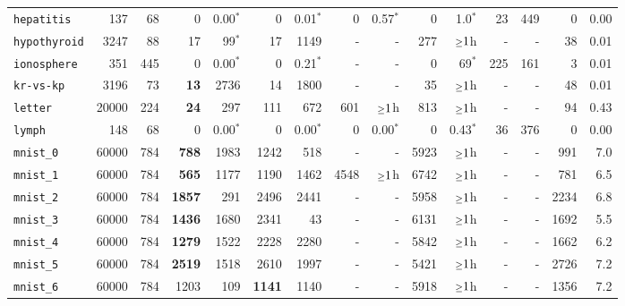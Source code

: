 \begin{tabular}{lccrrrrrrrrrrrr}
\texttt{hepatitis} & \multicolumn{1}{r}{137} & \multicolumn{1}{r}{68}  & 0 & 0.00$^*$ & 0 & 0.01$^*$ & 0 & 0.57$^*$ & 0 & 1.0$^*$ & 23 & 449 & 0 & 0.00\\
\texttt{hypothyroid} & \multicolumn{1}{r}{3247} & \multicolumn{1}{r}{88}  & 17 & 99$^*$ & 17 & 1149 & - & - & 277 & $\mathsmaller{\geq}1$h & - & - & 38 & 0.01\\
\texttt{ionosphere} & \multicolumn{1}{r}{351} & \multicolumn{1}{r}{445}  & 0 & 0.00$^*$ & 0 & 0.21$^*$ & - & - & 0 & 69$^*$ & 225 & 161 & 3 & 0.01\\
\texttt{kr-vs-kp} & \multicolumn{1}{r}{3196} & \multicolumn{1}{r}{73}  & \textbf{13} & 2736 & 14 & 1800 & - & - & 35 & $\mathsmaller{\geq}1$h & - & - & 48 & 0.01\\
\texttt{letter} & \multicolumn{1}{r}{20000} & \multicolumn{1}{r}{224}  & \textbf{24} & 297 & 111 & 672 & 601 & $\mathsmaller{\geq}1$h & 813 & $\mathsmaller{\geq}1$h & - & - & 94 & 0.43\\
\texttt{lymph} & \multicolumn{1}{r}{148} & \multicolumn{1}{r}{68}  & 0 & 0.00$^*$ & 0 & 0.00$^*$ & 0 & 0.00$^*$ & 0 & 0.43$^*$ & 36 & 376 & 0 & 0.00\\
\texttt{mnist\_0} & \multicolumn{1}{r}{60000} & \multicolumn{1}{r}{784}  & \textbf{788} & 1983 & 1242 & 518 & - & - & 5923 & $\mathsmaller{\geq}1$h & - & - & 991 & 7.0\\
\texttt{mnist\_1} & \multicolumn{1}{r}{60000} & \multicolumn{1}{r}{784}  & \textbf{565} & 1177 & 1190 & 1462 & 4548 & $\mathsmaller{\geq}1$h & 6742 & $\mathsmaller{\geq}1$h & - & - & 781 & 6.5\\
\texttt{mnist\_2} & \multicolumn{1}{r}{60000} & \multicolumn{1}{r}{784}  & \textbf{1857} & 291 & 2496 & 2441 & - & - & 5958 & $\mathsmaller{\geq}1$h & - & - & 2234 & 6.8\\
\texttt{mnist\_3} & \multicolumn{1}{r}{60000} & \multicolumn{1}{r}{784}  & \textbf{1436} & 1680 & 2341 & 43 & - & - & 6131 & $\mathsmaller{\geq}1$h & - & - & 1692 & 5.5\\
\texttt{mnist\_4} & \multicolumn{1}{r}{60000} & \multicolumn{1}{r}{784}  & \textbf{1279} & 1522 & 2228 & 2280 & - & - & 5842 & $\mathsmaller{\geq}1$h & - & - & 1662 & 6.2\\
\texttt{mnist\_5} & \multicolumn{1}{r}{60000} & \multicolumn{1}{r}{784}  & \textbf{2519} & 1518 & 2610 & 1997 & - & - & 5421 & $\mathsmaller{\geq}1$h & - & - & 2726 & 7.2\\
\texttt{mnist\_6} & \multicolumn{1}{r}{60000} & \multicolumn{1}{r}{784}  & 1203 & 109 & \textbf{1141} & 1140 & - & - & 5918 & $\mathsmaller{\geq}1$h & - & - & 1356 & 7.2\\

\end{tabular}

